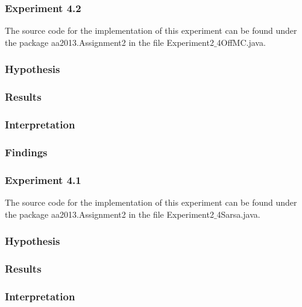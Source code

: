 \documentclass[11pt]{article}
\begin{document}
\subsubsection{Experiment 4.2}
The source code for the implementation of this experiment can be found under the package aa2013.Assignment2 in the file Experiment2$\_$4OffMC.java.
\subsubsection{Hypothesis}


\subsubsection{Results}


\subsubsection{Interpretation}


\subsubsection{Findings}



\subsubsection{Experiment 4.1}
The source code for the implementation of this experiment can be found under the package aa2013.Assignment2 in the file Experiment2$\_$4Sarsa.java.
\subsubsection{Hypothesis}


\subsubsection{Results}


\subsubsection{Interpretation}
\end{document}
